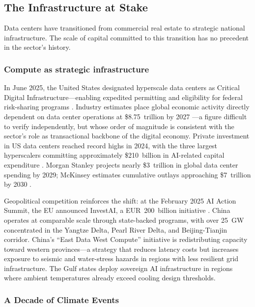 \newpage
\subsection*{The Infrastructure at Stake}\label{toc:infra}
\greensep

\begin{twocolbody}

\noindent Data centers have transitioned from commercial real estate to strategic national infrastructure. The scale of capital committed to this transition has no precedent in the sector's history.

\subsubsection*{Compute as strategic infrastructure}

In June 2025, the United States designated hyperscale data centers as Critical Digital Infrastructure---enabling expedited permitting and eligibility for federal risk-sharing programs \citep{thedatascientist2025}. Industry estimates place global economic activity directly dependent on data center operations at \$8.75~trillion by 2027 \citep{equinix2025}---a figure difficult to verify independently, but whose order of magnitude is consistent with the sector's role as transactional backbone of the digital economy. Private investment in US data centers reached record highs in 2024, with the three largest hyperscalers committing approximately \$210~billion in AI-related capital expenditure \citep{deloitte2025, allianz2025}. Morgan Stanley projects nearly \$3~trillion in global data center spending by 2029; McKinsey estimates cumulative outlays approaching \$7~trillion by 2030 \citep{allianz2025}.

Geopolitical competition reinforces the shift: at the February 2025 AI Action Summit, the EU announced InvestAI, a EUR~200~billion initiative \citep{spglobal2025}. China operates at comparable scale through state-backed programs, with over 25~GW concentrated in the Yangtze Delta, Pearl River Delta, and Beijing-Tianjin corridor. China's ``East Data West Compute'' initiative is redistributing capacity toward western provinces---a strategy that reduces latency costs but increases exposure to seismic and water-stress hazards in regions with less resilient grid infrastructure. The Gulf states deploy sovereign AI infrastructure in regions where ambient temperatures already exceed cooling design thresholds.

\subsubsection*{A Decade of Climate Events}


\end{twocolbody}

